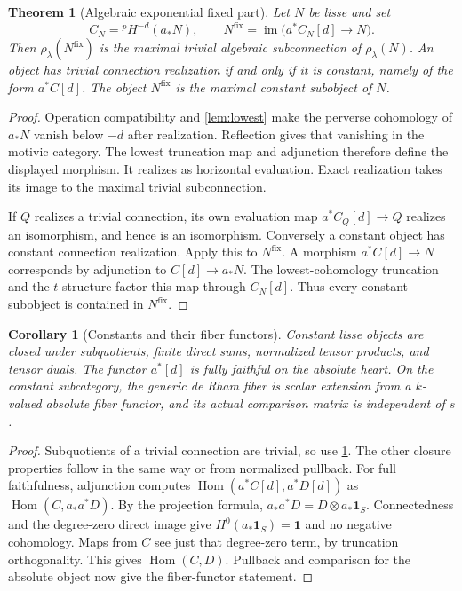 \documentclass[11pt]{article}
\numberwithin{equation}{section}
\newtheorem{theorem}{Theorem}[section]
\newtheorem{corollary}[corollary]{Corollary}
\theoremstyle{definition}
\theoremstyle{remark}
\newcommand{\im}{\operatorname{im}}
\newcommand{\Hom}{\operatorname{Hom}}
\newcommand{\fix}{\mathrm{fix}}
\newcommand{\pH}{{}^{p}\!H}
\newcommand{\one}{\mathbf1}
\begin{document}
\begin{theorem}[Algebraic exponential fixed part]\label{thm:fixed}\label{thm:fixed-part}\label{lem:constant-reflection-exp}
Let $N$ be lisse and set
\[
 C_N=\pH^{-d}(a_*N),\qquad
 N^{\fix}=\im\bigl(a^*C_N[d]\longrightarrow N\bigr).
\]
Then $\rho_\lambda(N^{\fix})$ is the maximal trivial algebraic
subconnection of $\rho_\lambda(N)$. An object has trivial connection
realization if and only if it is constant, namely of the form $a^*C[d]$.
The object $N^{\fix}$ is the maximal constant subobject of $N$.
\end{theorem}
\begin{proof}
Operation compatibility and \cref{lem:lowest} make the perverse cohomology
of $a_*N$ vanish below $-d$ after realization. Reflection gives that
vanishing in the motivic category. The lowest truncation map and adjunction
therefore define the displayed morphism. It realizes as horizontal
evaluation. Exact realization takes its image to the maximal trivial
subconnection.

If $Q$ realizes a trivial connection, its own evaluation map
$a^*C_Q[d]\to Q$ realizes an isomorphism, and hence is an isomorphism.
Conversely a constant object has constant connection realization. Apply
this to $N^{\fix}$. A morphism $a^*C[d]\to N$ corresponds by adjunction
to $C[d]\to a_*N$. The lowest-cohomology truncation and the $t$-structure
factor this map through $C_N[d]$. Thus every constant subobject is
contained in $N^{\fix}$.
\end{proof}

\begin{corollary}[Constants and their fiber functors]\label{cor:constants}\label{prop:constant-subquotients}
Constant lisse objects are closed under subquotients, finite direct sums,
normalized tensor products, and tensor duals. The functor $a^*[d]$ is
fully faithful on the absolute heart. On the constant subcategory, the
generic de Rham fiber is scalar extension from a $k$-valued absolute
fiber functor, and its actual comparison matrix is independent of $s$.
\end{corollary}
\begin{proof}
Subquotients of a trivial connection are trivial, so use
\cref{thm:fixed}. The other closure properties follow in the same way or
from normalized pullback. For full faithfulness, adjunction computes
$\Hom(a^*C[d],a^*D[d])$ as $\Hom(C,a_*a^*D)$. By the projection formula,
$a_*a^*D=D\otimes a_*\one_S$. Connectedness and the degree-zero direct
image give $H^0(a_*\one_S)=\one$ and no negative cohomology. Maps from
$C$ see just that degree-zero term, by truncation orthogonality. This gives
$\Hom(C,D)$. Pullback and comparison for the absolute object now give
the fiber-functor statement.
\end{proof}
\end{document}
